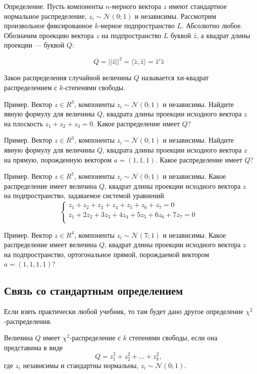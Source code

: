 \documentclass[11pt,russian,]{article}
\newcommand{\cN}{\mathcal{N}}
\newcommand{\1}{\mathbbm{1}}
\begin{document}
Определение. Пусть компоненты \(n\)-мерного вектора \(z\) имеют
стандартное нормальное распределение, \(z_i \sim \cN(0;1)\) и
независимы. Рассмотрим произвольное фиксированное \(k\)-мерное
подпространство \(L\). Абсолютно любое. Обозначим проекцию вектора \(z\)
на подпространство \(L\) буквой \(\hat z\), а квадрат длины проекции ---
буквой \(Q\):

\[
Q = ||\hat z||^2 = \langle \hat z, \hat z\rangle = \hat z'\hat z
\]

Закон распределения случайной величины \(Q\) называется хи-квадрат
распределением с \(k\)-степенями свободы.

Пример. Вектор \(z \in R^3\), компоненты \(z_i \sim \cN(0;1)\) и
независимы. Найдите явную формулу для величины \(Q\), квадрата длины
проекции исходного вектора \(z\) на плоскость \(z_1 + z_2 + z_3 =0\).
Какое распределение имеет \(Q\)?

Пример. Вектор \(z \in R^3\), компоненты \(z_i \sim \cN(0;1)\) и
независимы. Найдите явную формулу для величины \(Q\), квадрата длины
проекции исходного вектора \(z\) на прямую, порожденную вектором
\(a = (1, 1, 1)\). Какое распределение имеет \(Q\)?

Пример. Вектор \(z \in R^7\), компоненты \(z_i \sim \cN(0;1)\) и
независимы. Какое распределение имеет величина \(Q\), квадрат длины
проекции исходного вектора \(z\) на подпространство, задаваемое системой
уравнений \[
\begin{cases}
z_1 + z_2 + z_3 +z_4 + z_5 +z_6 + z_7 = 0 \\
z_1 + 2z_2 +3z_3 +4z_4 +5z_5+6z_6+7z_7 =0 \\
\end{cases}
\]

Пример. Вектор \(z \in R^4\), компоненты \(z_i \sim \cN(7;1)\) и
независимы. Какое распределение имеет величина \(Q\), квадрат длины
проекции исходного вектора \(z\) на подпространство, ортогональное
прямой, порождаемой вектором \(a=(1, 1, 1, 1)\)?

\subsection{Связь со стандартным определением}\label{---}

Если взять практически любой учебник, то там будет дано другое
определение \(\chi^2\)-распределения.

Величина \(Q\) имеет \(\chi^2\)-распределение с \(k\) степенями свободы,
если она представима в виде \[
Q = z_1^2 + z_2^2 + \ldots + z_k^2,
\] где \(z_i\) независимы и стандартны нормальны, \(z_i \sim \cN(0;1)\).
\end{document}

